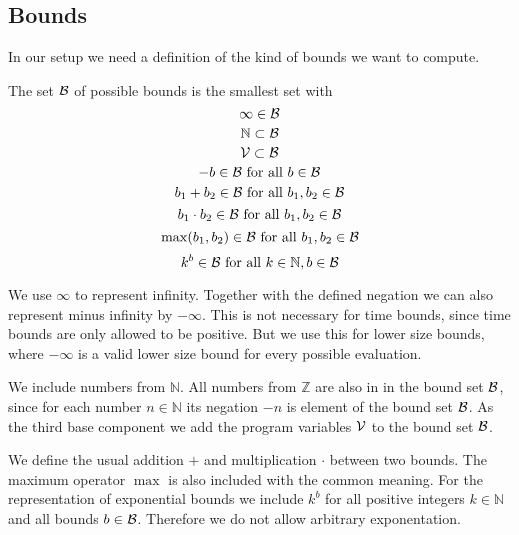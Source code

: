 \subsection{Bounds}

In our setup we need a definition of the kind of bounds we want to compute.

\begin{definition}
  The set $\mathcal{B}$ of possible bounds is the smallest set with
  \[ \infty \in \mathcal{B} \]
  \[ \mathbb{N} \subset \mathcal{B} \] 
  \[ \mathcal{V} \subset \mathcal{B} \] 
  \[ -b \in \mathcal{B} \text{ for all } b \in \mathcal{B} \] 
  \[ b_1 + b_2 \in \mathcal{B} \text{ for all } b_1, b_2 \in \mathcal{B} \] 
  \[ b_1 \cdot b_2 \in \mathcal{B} \text{ for all } b_1, b_2 \in \mathcal{B} \] 
  \[ \max(b_1, b_2) \in \mathcal{B} \text{ for all } b_1, b_2 \in \mathcal{B} \]
  \[ k^b \in \mathcal{B} \text{ for all } k \in \mathbb{N}, b \in \mathcal{B} \]
\end{definition}

We use $\infty$ to represent infinity.
Together with the defined negation we can also represent minus infinity by $-\infty$.
This is not necessary for time bounds, since time bounds are only allowed to be positive.
But we use this for lower size bounds, where $-\infty$ is a valid lower size bound for every possible evaluation.

We include numbers from $\mathbb{N}$.
All numbers from $\mathbb{Z}$ are also in in the bound set $\mathcal{B}$, since for each number $n \in \mathbb{N}$ its negation $-n$ is element of the bound set $\mathcal{B}$.
As the third base component we add the program variables $\mathcal{V}$ to the bound set $\mathcal{B}$.

We define the usual addition $+$ and multiplication $\cdot$ between two bounds.
The maximum operator $\max$ is also included with the common meaning.
For the representation of exponential bounds we include $k^b$ for all positive integers $k \in \mathbb{N}$ and all bounds $b \in \mathcal{B}$.
Therefore we do not allow arbitrary exponentation.

